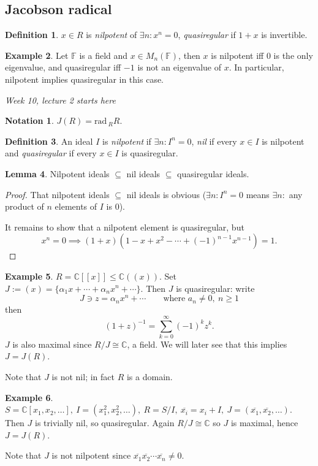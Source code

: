 \documentclass[a4paper]{article}
\newcommand{\F}{\mathbb{F}}
\newcommand{\C}{\mathbb{C}}
\newcommand{\rad}{\text{rad}\,}
\theoremstyle{definition}
\newtheorem{defn}{Definition}[subsection]
\newtheorem{lemma}[defn]{Lemma}
\newtheorem{example}[defn]{Example}
\newtheorem*{notation}{Notation}
\begin{document}
\subsection{Jacobson radical}
\begin{defn}
$x\in R$ is \textit{nilpotent} of $\exists n:x^n=0$, \textit{quasiregular} if $1+x$ is invertible.
\end{defn}
\begin{example}
Let $\F$ is a field and $x\in M_n(\F)$, then $x$ is nilpotent iff 0 is the only eigenvalue, and quasiregular iff $-1$ is not an eigenvalue of $x$. In particular, nilpotent implies quasiregular in this case.
\end{example}

\begin{flushright}
\textit{Week 10, lecture 2 starts here}
\end{flushright}

\begin{notation}
$J(R)=\rad{}_RR$.
\end{notation}
\begin{defn}
An ideal $I$ is \textit{nilpotent} if $\exists n:I^n=0$, \textit{nil} if every $x\in I$ is nilpotent and \textit{quasiregular} if every $x\in I$ is quasiregular.
\end{defn}
\begin{lemma}
Nilpotent ideals $\subseteq$ nil ideals $\subseteq$ quasiregular ideals.
\end{lemma}
\begin{proof}
That nilpotent ideals $\subseteq$ nil ideals is obvious ($\exists n:I^n=0$ means $\exists n:$ any product of $n$ elements of $I$ is 0).

It remains to show that a nilpotent element is quasiregular, but
\[
x^n=0\implies (1+x)(1-x+x^2-\cdots+(-1)^{n-1}x^{n-1})=1.
\]
\end{proof}

\begin{example}
$R=\C[[x]]\leq\C((x))$. Set $J:=(x)=\{\alpha_1 x+\cdots+\alpha_n x^n+\cdots\}$. Then $J$ is quasiregular: write
\[
J\ni z=\alpha_n x^n+\cdots\qquad\text{where }a_n\neq 0,\ n\geq 1
\]
then
\[
(1+z)^{-1}=\sum_{k=0}^\infty (-1)^k z^k.
\]
$J$ is also maximal since $R/J\cong \C$, a field. We will later see that this implies $J=J(R)$.

Note that $J$ is not nil; in fact $R$ is a domain.
\end{example}

\begin{example}
$S=\C[x_1,x_2,\ldots],\ I=(x_1^2,x_2^2,\ldots),\ R=S/I,\ \overline{x_i}=x_i+I,\ J=(\overline{x_1},\overline{x_2},\ldots)$. Then $J$ is trivially nil, so quasiregular. Again $R/J\cong\C$ so $J$ is maximal, hence $J=J(R)$.

Note that $J$ is not nilpotent since $\overline{x_1}\overline{x_2}\cdots\overline{x_n}\neq 0$.
\end{example}
\end{document}
